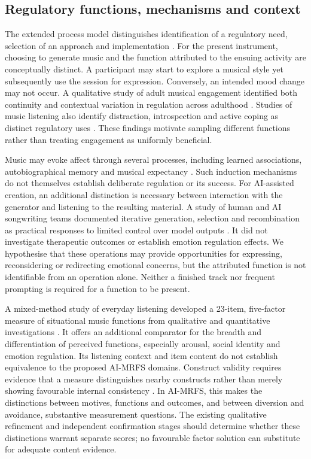 \subsection{Regulatory functions, mechanisms and context}
The extended process model distinguishes identification of a regulatory need, selection of an approach and implementation \parencite{gross2015}. For the present instrument, choosing to generate music and the function attributed to the ensuing activity are conceptually distinct. A participant may start to explore a musical style yet subsequently use the session for expression. Conversely, an intended mood change may not occur. A qualitative study of adult musical engagement identified both continuity and contextual variation in regulation across adulthood \parencite{saarikallio2011}. Studies of music listening also identify distraction, introspection and active coping as distinct regulatory uses \parencite{vangoethem2011}. These findings motivate sampling different functions rather than treating engagement as uniformly beneficial.

Music may evoke affect through several processes, including learned associations, autobiographical memory and musical expectancy \parencite{juslin2008}. Such induction mechanisms do not themselves establish deliberate regulation or its success. For AI-assisted creation, an additional distinction is necessary between interaction with the generator and listening to the resulting material. A study of human and AI songwriting teams documented iterative generation, selection and recombination as practical responses to limited control over model outputs \parencite{huang2020}. It did not investigate therapeutic outcomes or establish emotion regulation effects. We hypothesise that these operations may provide opportunities for expressing, reconsidering or redirecting emotional concerns, but the attributed function is not identifiable from an operation alone. Neither a finished track nor frequent prompting is required for a function to be present.

A mixed-method study of everyday listening developed a 23-item, five-factor measure of situational music functions from qualitative and quantitative investigations \parencite{henry2024}. It offers an additional comparator for the breadth and differentiation of perceived functions, especially arousal, social identity and emotion regulation. Its listening context and item content do not establish equivalence to the proposed AI-MRFS domains. Construct validity requires evidence that a measure distinguishes nearby constructs rather than merely showing favourable internal consistency \parencite{clark2019}. In AI-MRFS, this makes the distinctions between motives, functions and outcomes, and between diversion and avoidance, substantive measurement questions. The existing qualitative refinement and independent confirmation stages should determine whether these distinctions warrant separate scores; no favourable factor solution can substitute for adequate content evidence.

